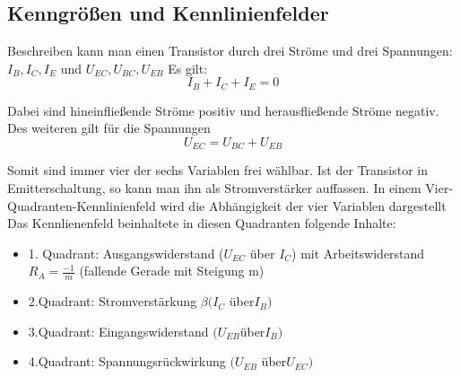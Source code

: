 \documentclass{article}
\begin{document}
\subsection{Kenngrößen und Kennlinienfelder}
Beschreiben kann man einen Transistor durch drei Ströme und drei Spannungen: \(I_B,I_C,I_E\) und \(U_{EC},U_{BC},U_{EB}\)
Es gilt:
\begin{equation}
I_B+I_C+I_E=0
\end{equation}

Dabei sind hineinfließende Ströme positiv und herausfließende Ströme negativ.\\
Des weiteren gilt für die Spannungen
\begin{equation}
U_{EC}=U_{BC}+U_{EB}
\end{equation}

Somit sind immer vier der sechs Variablen frei wählbar.
Ist der Transistor in Emitterschaltung, so kann man ihn als Stromverstärker auffassen. In einem Vier-Quadranten-Kennlinienfeld wird die Abhängigkeit der vier Variablen dargestellt
\newpage
Das Kennlienenfeld beinhaltete in diesen Quadranten folgende Inhalte:\\
\begin{itemize}
\item 1. Quadrant: Ausgangswiderstand ($U_{EC}$ über $I_C$) mit Arbeitswiderstand $R_A = \frac{-1}{m}$ (fallende Gerade mit Steigung m)
\item 2.Quadrant: Stromverstärkung $\beta  (I_C$ über$ I_B)$
\item 3.Quadrant: Eingangswiderstand $(U_{EB} $über$ I_B)$
\item 4.Quadrant: Spannungsrückwirkung $(U_{EB}$ über$ U_{EC})$ 
\end{itemize}

\begin{center}
\begin{minipage}{\linewidth}
\centering
{}
%
\label{transistor}
\end{minipage}
\end{center}
\end{document}
